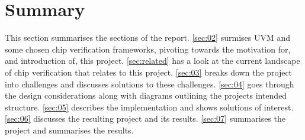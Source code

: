 \section{Summary}\label{sec:01}
This section summarises the sections of the report.\newline
\cref{sec:02} surmises UVM and some chosen chip verification frameworks, pivoting towards the motivation for, and introduction of, this project.\newline
\cref{sec:related} has a look at the current landscape of chip verification that relates to this project.\newline
\cref{sec:03} breaks down the project into challenges and discusses solutions to these challenges.\newline
\cref{sec:04} goes through the design considerations along with diagrams outlining the projects intended structure.\newline
\cref{sec:05} describes the implementation and shows solutions of interest.\newline
\cref{sec:06} discusses the resulting project and its results.\newline
\cref{sec:07} summarises the project and summarises the results.\newline